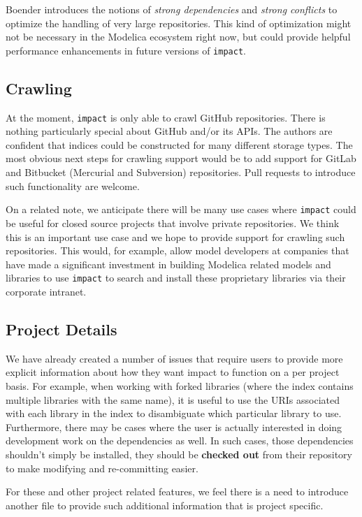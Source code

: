 \documentclass[11pt,a4paper,twocolumn]{article}
\newcommand{\code}[1]{\texttt{#1}} %
\begin{document}
Boender introduces the notions of \emph{strong dependencies} and
\emph{strong conflicts} to optimize the handling of very large
repositories.  This kind of optimization might not be necessary in
the Modelica ecosystem right now, but could provide helpful
performance enhancements in future versions of \code{impact}.

\subsection{Crawling}

At the moment, \code{impact} is only able to crawl GitHub
repositories.  There is nothing particularly special about GitHub
and/or its APIs.  The authors are confident that indices could be
constructed for many different storage types.  The most obvious next
steps for crawling support would be to add support for GitLab and
Bitbucket (Mercurial and Subversion) repositories.  Pull requests to
introduce such functionality are welcome.

On a related note, we anticipate there will be many use cases where
\code{impact} could be useful for closed source projects that involve
private repositories.  We think this is an important use case and we
hope to provide support for crawling such repositories.  This would,
for example, allow model developers at companies that have made a
significant investment in building Modelica related models and
libraries to use \code{impact} to search and install these proprietary
libraries via their corporate intranet.

\subsection{Project Details}

We have already created a number of issues that require users to
provide more explicit information about how they want impact to
function on a per project basis.  For example, when working with
forked libraries (where the index contains multiple libraries with the
same name), it is useful to use the URIs associated with each library
in the index to disambiguate which particular library to use.
Furthermore, there may be cases where the user is actually interested
in doing development work on the dependencies as well.  In such cases,
those dependencies shouldn't simply be installed, they should be
\textbf{checked out} from their repository to make modifying and
re-committing easier.

For these and other project related features, we feel there is a need
to introduce another file to provide such additional information that
is project specific.
\end{document}

